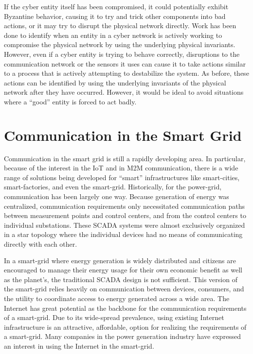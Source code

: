 If the cyber entity itself has been compromised, it could potentially exhibit Byzantine behavior, causing it to try and trick other components into bad actions\cite{Roth2012}, or it may try to disrupt the physical network directly.
Work has been done to identify when an entity in a cyber network is actively working to compromise the physical network by using the underlying physical invariants.
However, even if a cyber entity is trying to behave correctly, disruptions to the communication network or the sensors it uses can cause it to take actions similar to a process that is actively attempting to destabilize the system.
As before, these actions can be identified by using the underlying invariants of the physical network after they have occurred.
However, it would be ideal to avoid situations where a ``good'' entity is forced to act badly.

\section{Communication in the Smart Grid}

Communication in the smart grid is still a rapidly developing area.
In particular, because of the interest in the \ac{IoT} and in \ac{M2M} communication, there is a wide range of solutions being developed for ``smart'' infrastructures like smart-cities, smart-factories, and even the smart-grid.
Historically, for the power-grid, communication has been largely one way.
Because generation of energy was centralized, communication requirements only necessitated communication paths between measurement points and control centers, and from the control centers to individual substations\cite{smartgrid-comm1}.
These \ac{SCADA} systems were almost exclusively organized in a star topology where the individual devices had no means of communicating directly with each other.

In a smart-grid where energy generation is widely distributed and citizens are encouraged to manage their energy usage for their own economic benefit as well as the planet's, the traditional \ac{SCADA} design is not sufficient\cite{smartgrid-comm1}\cite{smartgrid-comm-lastmile}\cite{smartgrid-comm-m2m}.
This version of the smart-grid relies heavily on communication between devices, consumers, and the utility to coordinate access to energy generated across a wide area.
The Internet has great potential as the backbone for the communication requirements of a smart-grid.
Due to its wide-spread prevalence, using existing Internet infrastructure is an attractive, affordable, option for realizing the requirements of a smart-grid\cite{smartgrid-comm-germany}\cite{smartgrid-comm-lastmile}.
Many companies in the power generation industry have expressed an interest in using the Internet in the smart-grid\cite{smartgrid-comm-doe}.

